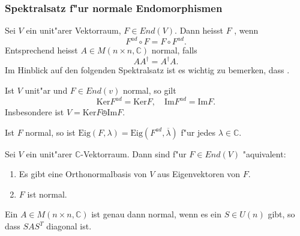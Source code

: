 \documentclass[8pt, a4paper, twocolumn, landscape]{article}
\begin{document}
\subsubsection{Spektralsatz f"ur normale Endomorphismen}

\begin{definition}
Sei $V$ ein unit"arer Vektorraum, $F \in End(V)$. Dann heisst $F$ , wenn 
$$
F^{ad}\circ F = F \circ F^{ad}.
$$
Entsprechend heisst $A \in M(n \times n, \mathbb{C})$ normal, falls
$$
A A^\dagger = A^\dagger A.
$$
Im Hinblick auf den folgenden Spektralsatz ist es wichtig zu bemerken, dass .
\end{definition}

\begin{theorem}
Ist $V$ unit"ar und $F \in End(v)$ normal, so gilt
$$
\mathrm{Ker}F^{ad} = \mathrm{Ker}F, \quad \mathrm{Im}F^{ad} = \mathrm{Im}F.
$$
Insbesondere ist $V = \mathrm{Ker}F \obot \mathrm{Im}F$.
\end{theorem}

\begin{corollary}
Ist $F$ normal, so ist $\mathrm{Eig}(F, \lambda) = \mathrm{Eig}(F^{ad}, \overline{\lambda})$ f"ur jedes $\lambda \in \mathbb{C}$.
\end{corollary}

\begin{theorem} 
Sei $V$ ein unit"arer $\mathbb{C}$-Vektorraum. Dann sind f"ur $F \in End(V)$ "aquivalent:
\begin{enumerate}
\item Es gibt eine Orthonormalbasis von $V$ aus Eigenvektoren von $F$.
\item $F$ ist normal.
\end{enumerate}
\end{theorem}

\begin{corollary}
Ein $A \in M (n \times n, \mathbb{C})$ ist genau dann normal, wenn es ein $S \in U(n)$ gibt, so dass $SAS^T$ diagonal ist.
\end{corollary}
\end{document}
